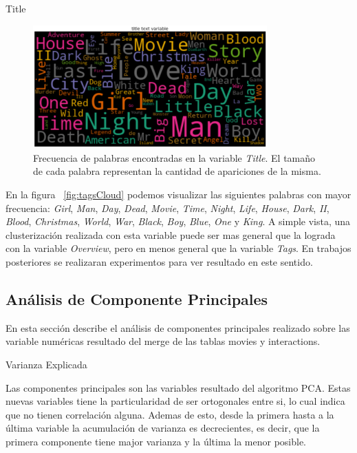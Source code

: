 \documentclass[11pt,a4paper,twoside]{thesis}
\begin{document}
\begin{description}
	\item[Title]
\end{description}

\begin{figure}[h!]
	\centering
	\includegraphics[width=9cm]{./images/Cloud-Title.png}
	\caption{Frecuencia de palabras encontradas en la variable \textit{Title}. El tamaño de cada palabra representan la cantidad de apariciones de la misma.}
	\label{fig:titleCloud}
\end{figure}	


En la figura ~\ref{fig:tagsCloud} podemos visualizar las siguientes palabras con mayor frecuencia: \textit{Girl}, \textit{Man}, \textit{Day}, \textit{Dead}, \textit{Movie}, \textit{Time}, \textit{Night}, \textit{Life}, \textit{House}, \textit{Dark}, \textit{II}, \textit{Blood}, \textit{Christmas}, \textit{World}, \textit{War}, \textit{Black}, \textit{Boy}, \textit{Blue}, \textit{One} y \textit{King}. A simple vista, una clusterización realizada con esta variable puede ser mas general que la lograda con la variable \textit{Overview}, pero en menos general que la variable \textit{Tags}. En trabajos posteriores se realizaran experimentos para ver resultado en este sentido.


\clearpage

\subsection{Análisis de Componente Principales}

En esta sección describe el análisis de componentes principales realizado sobre las variable numéricas resultado del merge de las tablas movies y interactions.

\begin{description}
	\item[Varianza Explicada]
\end{description}

Las componentes principales son las variables resultado del algoritmo PCA. Estas nuevas variables tiene la particularidad de ser ortogonales entre si, lo cual indica que no tienen correlación alguna. Ademas de esto, desde la primera hasta a la última variable la acumulación de varianza es decrecientes, es decir, que la primera componente tiene major varianza y la última la menor posible. 
\end{document}
